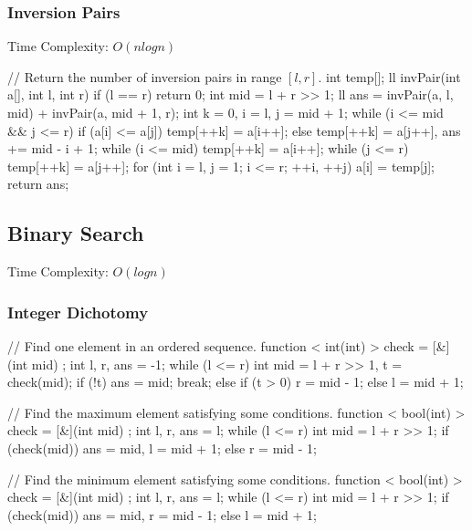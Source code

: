 \subsubsection{Inversion Pairs}
Time Complexity: $O(nlogn)$
\begin{cppcode}
// Return the number of inversion pairs in range $[l, r]$.
int temp[];
ll invPair(int a[], int l, int r)
{
    if (l == r) return 0;
    int mid = l + r >> 1;
    ll ans = invPair(a, l, mid) + invPair(a, mid + 1, r);
    int k = 0, i = l, j = mid + 1;
    while (i <= mid && j <= r)
    {
        if (a[i] <= a[j]) temp[++k] = a[i++];
        else temp[++k] = a[j++], ans += mid - i + 1;
    }
    while (i <= mid) temp[++k] = a[i++];
    while (j <= r) temp[++k] = a[j++];
    for (int i = l, j = 1; i <= r; ++i, ++j) a[i] = temp[j];
    return ans;
}
\end{cppcode}

\subsection{Binary Search}
Time Complexity: $O(logn)$
\subsubsection{Integer Dichotomy}
\begin{cppcode}
// Find one element in an ordered sequence.
function < int(int) > check = [&](int mid) {};
int l, r, ans = -1;
while (l <= r)
{
    int mid = l + r >> 1, t = check(mid);
    if (!t)
    {
        ans = mid; break;
    }
    else
    {
        if (t > 0) r = mid - 1;
        else l = mid + 1;
    }
}
\end{cppcode}
\begin{cppcode}
// Find the maximum element satisfying some conditions.
function < bool(int) > check = [&](int mid) {};
int l, r, ans = l;
while (l <= r)
{
    int mid = l + r >> 1;
    if (check(mid)) ans = mid, l = mid + 1;
    else r = mid - 1;
}
\end{cppcode}
\begin{cppcode}
// Find the minimum element satisfying some conditions.
function < bool(int) > check = [&](int mid) {};
int l, r, ans = l;
while (l <= r)
{
    int mid = l + r >> 1;
    if (check(mid)) ans = mid, r = mid - 1;
    else l = mid + 1;
}
\end{cppcode}

